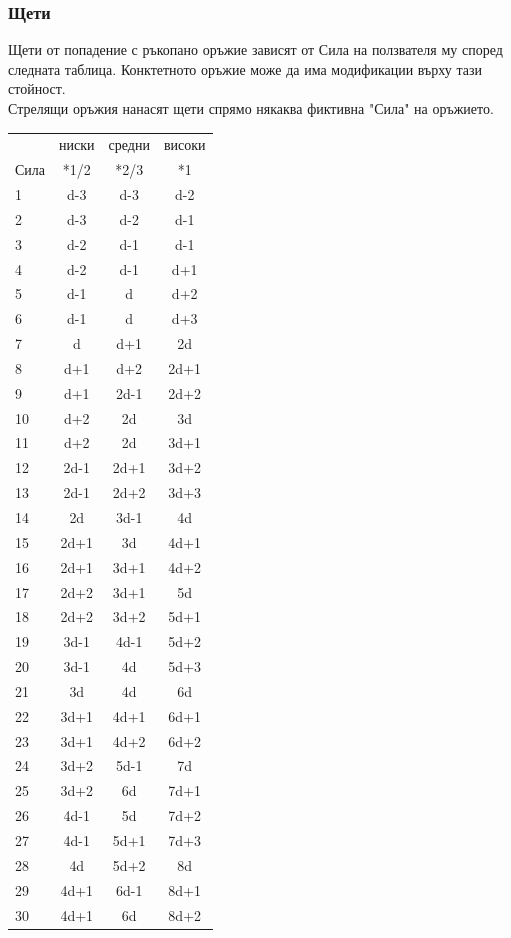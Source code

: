 \subsubsection{Щети}
Щети от попадение с ръкопано оръжие зависят от Сила на ползвателя му според следната таблица.
Конктетното оръжие може да има модификации върху тази стойност.
\\
Стрелящи оръжия нанасят щети спрямо някаква фиктивна "Сила" на оръжието.
\\
\begin{tabular}{l | c | c | c}
     & ниски & средни & високи  \\
Сила & *1/2  & *2/3   & *1      \\
1  & d-3  & d-3  & d-2   \\
2  & d-3  & d-2  & d-1   \\
3  & d-2  & d-1  & d-1   \\
4  & d-2  & d-1  & d+1   \\
5  & d-1  & d    & d+2   \\
6  & d-1  & d    & d+3   \\
7  & d    & d+1  & 2d    \\
8  & d+1  & d+2  & 2d+1  \\
9  & d+1  & 2d-1 & 2d+2  \\
10 & d+2  & 2d   & 3d    \\
11 & d+2  & 2d   & 3d+1  \\
12 & 2d-1 & 2d+1 & 3d+2  \\
13 & 2d-1 & 2d+2 & 3d+3  \\
14 & 2d   & 3d-1 & 4d    \\
15 & 2d+1 & 3d   & 4d+1  \\
16 & 2d+1 & 3d+1 & 4d+2  \\
17 & 2d+2 & 3d+1 & 5d    \\
18 & 2d+2 & 3d+2 & 5d+1  \\
19 & 3d-1 & 4d-1 & 5d+2  \\
20 & 3d-1 & 4d   & 5d+3  \\
21 & 3d   & 4d   & 6d    \\
22 & 3d+1 & 4d+1 & 6d+1  \\
23 & 3d+1 & 4d+2 & 6d+2  \\
24 & 3d+2 & 5d-1 & 7d    \\
25 & 3d+2 & 6d   & 7d+1  \\
26 & 4d-1 & 5d   & 7d+2  \\
27 & 4d-1 & 5d+1 & 7d+3  \\
28 & 4d   & 5d+2 & 8d    \\
29 & 4d+1 & 6d-1 & 8d+1  \\
30 & 4d+1 & 6d   & 8d+2
\end{tabular}


